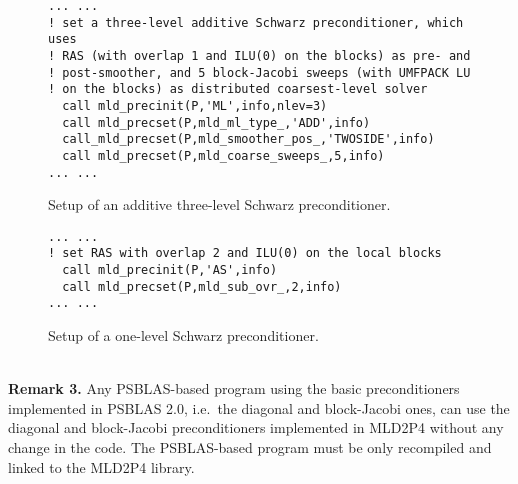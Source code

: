 \begin{figure}[tbh]
\begin{center}
\begin{minipage}{.90\textwidth} 
{\small
\begin{verbatim}
... ...
! set a three-level additive Schwarz preconditioner, which uses 
! RAS (with overlap 1 and ILU(0) on the blocks) as pre- and 
! post-smoother, and 5 block-Jacobi sweeps (with UMFPACK LU
! on the blocks) as distributed coarsest-level solver
  call mld_precinit(P,'ML',info,nlev=3)
  call mld_precset(P,mld_ml_type_,'ADD',info)
  call_mld_precset(P,mld_smoother_pos_,'TWOSIDE',info)
  call mld_precset(P,mld_coarse_sweeps_,5,info)
... ...
\end{verbatim}
}
\end{minipage}

\caption{Setup of an additive three-level Schwarz preconditioner.\label{fig:ex_3la}}
\end{center}
\end{figure}

\begin{figure}[tbh]
\begin{center}
\begin{minipage}{.90\textwidth} 
{\small
\begin{verbatim}
... ...
! set RAS with overlap 2 and ILU(0) on the local blocks
  call mld_precinit(P,'AS',info)
  call mld_precset(P,mld_sub_ovr_,2,info)
... ...
\end{verbatim}
}
\end{minipage}
\caption{Setup of a one-level Schwarz preconditioner.\label{fig:ex_1l}}
\end{center}
\end{figure}

\ \\
\textbf{Remark 3.} Any PSBLAS-based program using the basic preconditioners
implemented in PSBLAS 2.0, i.e.\ the diagonal and block-Jacobi ones,
can use the diagonal and block-Jacobi preconditioners
implemented in MLD2P4 without any change in the code.
The PSBLAS-based program must be only recompiled
and linked to the MLD2P4 library.

